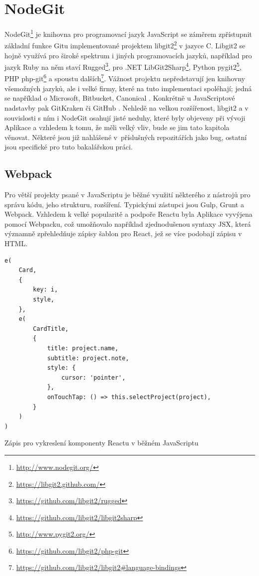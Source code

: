\chapter{NodeGit}

NodeGit\footnote{\url{http://www.nodegit.org/}} je knihovna pro programovací jazyk JavaScript se záměrem zpřístupnit základní funkce Gitu implementované projektem libgit2\footnote{\url{https://libgit2.github.com/}} v jazyce C. Libgit2 se hojně využívá pro široké spektrum i jiných programovacích jazyků, například pro jazyk Ruby na něm staví Rugged\footnote{\url{https://github.com/libgit2/rugged}}, pro .NET LibGit2Sharp\footnote{\url{https://github.com/libgit2/libgit2sharp}}, Python pygit2\footnote{\url{http://www.pygit2.org/}}, PHP php-git\footnote{\url{https://github.com/libgit2/php-git}} a spoustu dalších\footnote{\url{https://github.com/libgit2/libgit2\#language-bindings}}. Vážnost projektu nepředstavují jen knihovny všemožných jazyků, ale i velké firmy, které na tuto implementaci spoléhají; jedná se například o Microsoft, Bitbucket, Canonical \cite{libgit2-companies}. Konkrétně u JavaScriptové nadstavby pak GitKraken či GitHub \cite{nodegit-products}. Nehledě na velkou rozšířenost, libgit2 a v souvislosti s ním i NodeGit osahují jisté neduhy, které byly objeveny při vývoji Aplikace a vzhledem k tomu, že měli velký vliv, bude se jim tato kapitola věnovat. Některé jsou již nahlášené v~příslušných repozitářích jako bug, ostatní jsou specifické pro tuto bakalářskou práci.

\section{Webpack}

Pro větší projekty psané v JavaScriptu je běžné využití některého z nástrojů pro správu kódu, jeho strukturu, rozšíření. Typickými zástupci jsou Gulp, Grunt a Webpack. Vzhledem k velké popularitě a podpoře Reactu byla Aplikace vyvýjena pomocí Webpacku, což umožňovalo například zjednodušenou syntaxy JSX, která významně zpřehledňuje zápisy šablon pro React, jež se více podobají zápisu v HTML.

\begin{listing}[ht]
\begin{verbatim}
e(
	Card,
	{
		key: i,
		style,
	},
	e(
		CardTitle,
		{
			title: project.name,
			subtitle: project.note,
			style: {
				cursor: 'pointer',
			},
			onTouchTap: () => this.selectProject(project),
		}
	)
)
\end{verbatim}
\caption[Komponenta v JavaScriptu]{Zápis pro vykreslení komponenty Reactu v běžném JavaScriptu}
\end{listing}

